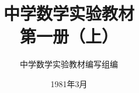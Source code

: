 \documentclass[a4paper, openany]{ctexbook}
\theoremstyle{plain}
\begin{document}
\title{\titlefont\Huge\bfseries 中学数学实验教材\\第一册（上）}



\author{\Large 中学数学实验教材编写组编}
\date{\Large 1981年3月}

\maketitle


\frontmatter


\tableofcontents


\mainmatter




%
%
%
%
\end{document}
